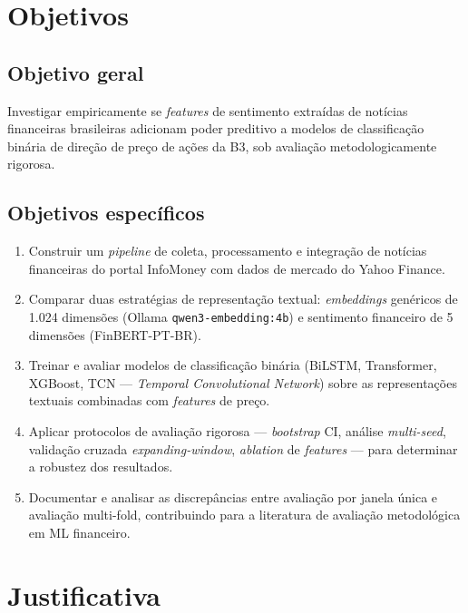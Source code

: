 \section{Objetivos}

\subsection{Objetivo geral}

Investigar empiricamente se \textit{features} de sentimento extraídas de notícias financeiras brasileiras adicionam poder preditivo a modelos de classificação binária de direção de preço de ações da B3, sob avaliação metodologicamente rigorosa.

\subsection{Objetivos específicos}

\begin{enumerate}
    \item Construir um \textit{pipeline} de coleta, processamento e integração de notícias financeiras do portal InfoMoney com dados de mercado do Yahoo Finance.
    \item Comparar duas estratégias de representação textual: \textit{embeddings} genéricos de 1.024 dimensões (Ollama \texttt{qwen3-\allowbreak embedding:\allowbreak 4b}) e sentimento financeiro de 5 dimensões (FinBERT-\allowbreak PT-\allowbreak BR).
    \item Treinar e avaliar modelos de classificação binária (BiLSTM, Transformer, XGBoost, TCN --- \textit{Temporal Convolutional Network}) sobre as representações textuais combinadas com \textit{features} de preço.
    \item Aplicar protocolos de avaliação rigorosa --- \textit{bootstrap} CI, análise \textit{multi-seed}, validação cruzada \textit{expanding-window}, \textit{ablation} de \textit{features} --- para determinar a robustez dos resultados.
    \item Documentar e analisar as discrepâncias entre avaliação por janela única e avaliação multi-fold, contribuindo para a literatura de avaliação metodológica em ML financeiro.
\end{enumerate}

\section{Justificativa}

